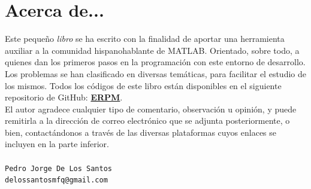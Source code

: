 \chapter*{Acerca de...}

Este pequeño \textit{libro} se ha escrito con la finalidad de aportar una herramienta auxiliar a la comunidad 
hispanohablante de MATLAB. Orientado, sobre todo, a quienes dan los primeros pasos en la programación 
con este entorno de desarrollo.\\

Los problemas se han clasificado en diversas temáticas, para facilitar el estudio de los mismos. 
Todos los códigos de este libro están disponibles en el siguiente repositorio de GitHub: 
\href{https://github.com/JorgeDeLosSantos}{\bfseries\color{mauve} ERPM}.\\

El autor agradece cualquier tipo de comentario, observación u opinión, y puede remitirla 
a la dirección de correo electrónico que se adjunta posteriormente, o bien, contactándonos 
a través de las diversas plataformas cuyos enlaces se incluyen en la parte inferior.\\ \\

\texttt{Pedro Jorge De Los Santos}\\
\texttt{delossantosmfq@gmail.com}\\

